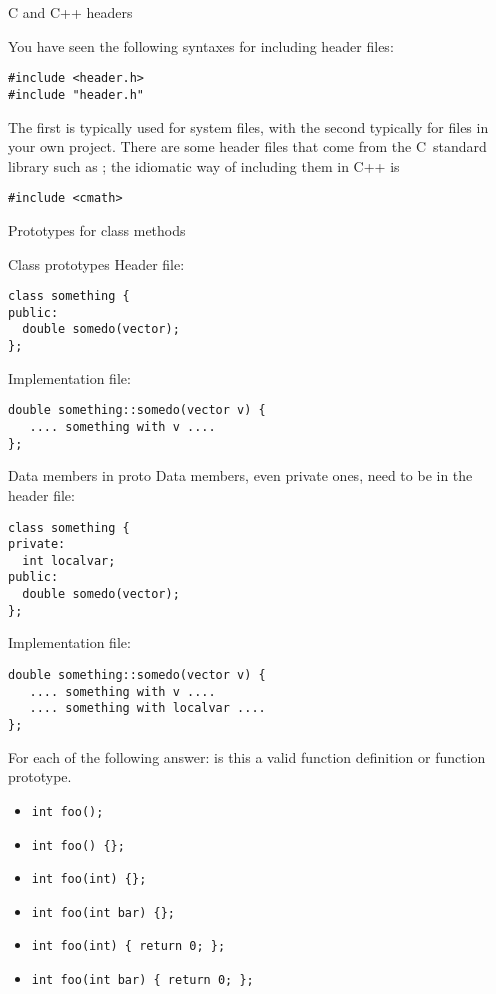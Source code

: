  {C and C++ headers}

You have seen the following syntaxes for including header files:
\begin{lstlisting}
#include <header.h>
#include "header.h"
\end{lstlisting}
The first is typically used for system files, with the second
typically for files in your own project. There are some header files
that come from the C~standard library such as ; the
idiomatic way of including them in C++ is
\begin{lstlisting}
#include <cmath>
\end{lstlisting}

 {Prototypes for class methods}

\begin{block}{Class prototypes}
  \label{sl:class-proto}
  Header file:
\begin{lstlisting}
class something {
public:
  double somedo(vector);
};
\end{lstlisting}

Implementation file:
\begin{lstlisting}
double something::somedo(vector v) {
   .... something with v ....
};
\end{lstlisting}
\end{block}

\begin{block}{Data members in proto}
  Data members, even private ones, need to be in the header file:
\begin{lstlisting}
class something {
private:
  int localvar;
public:
  double somedo(vector);
};
\end{lstlisting}
Implementation file:
\begin{lstlisting}
double something::somedo(vector v) {
   .... something with v ....
   .... something with localvar ....
};
\end{lstlisting}
\end{block}

\begin{review}
  \label{rev:proto-c-cpp}
  For each of the following answer: is this a valid function
  definition or function prototype.
  \begin{itemize}
  \item \verb+int foo();+
  \item \verb+int foo() {};+
  \item \verb+int foo(int) {};+
  \item \verb+int foo(int bar) {};+
  \item \verb+int foo(int) { return 0; };+
  \item \verb+int foo(int bar) { return 0; };+
  \end{itemize}
\end{review}

